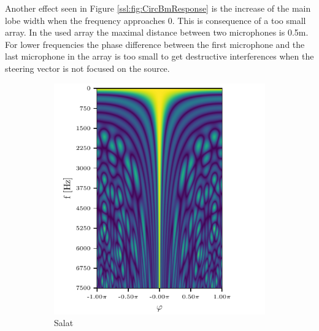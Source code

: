 Another effect seen in Figure \ref*{ssl:fig:CircBmResponse} is the increase
of the main lobe width when the frequency approaches 0.
This is consequence of a too small array. 
In the used array the maximal distance between two microphones is 0.5m.
For lower frequencies the phase difference between the first microphone and 
the last microphone in the array is too small to get destructive
interferences when the steering vector is not focused on the source.


\begin{figure}[h]
	\centering
	\begin{subfigure}[t]{0.45\textwidth}
		\centering
		\includegraphics[width=\textwidth]{circ_f_sweep_0.pdf}
		\caption{Salat}
		\label{ssl:fig:f_dep0}
	\end{subfigure}
	\hfill
	\begin{subfigure}[t]{0.45\textwidth}
		\centering

\end{subfigure}
\end{figure}
